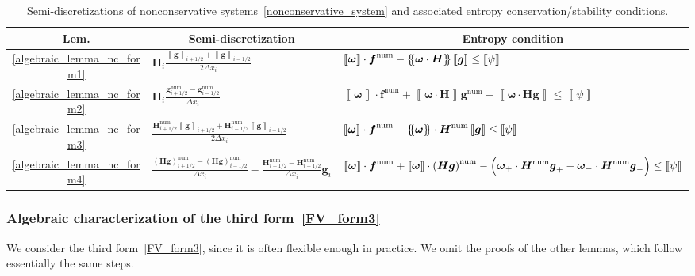\documentclass[]{scrartcl}
\newcommand*{\ldblbrace}{\{\mskip-5mu \left \{}
\newcommand*{\rdblbrace}{ \}\mskip-5mu \right \}}
\newcommand{\mean}[1]{\left\ldblbrace #1 \right\rdblbrace}
\renewcommand{\vec}[1]{\boldsymbol{#1}}
\newcommand{\jump}[1]{\left\llbracket #1  \right\rrbracket}
\theoremstyle{definition}
\begin{document}
\begin{table}[htbp]
\centering
  \caption{Semi-discretizations of nonconservative systems~\eqref{nonconservative_system} and associated entropy conservation/stability conditions.}
  \label{table_formulation}
  \centering
  \footnotesize
    \begin{tabular}{c ll}
      \toprule
      \multicolumn{1}{c}{Lem.}
      & \multicolumn{1}{c}{Semi-discretization}
      & \multicolumn{1}{c}{Entropy condition}\\
      \midrule
\ref{algebraic_lemma_nc_form1}
& $\vec{H}_i\frac{\jump{\vec{g}}_{i+1/2} + \jump{\vec{g}}_{i-1/2}}{2 \Delta x_i}$
& $\jump{\vec{\omega}} \cdot \vec{f}^\mathrm{num} - \mean{\vec{\omega} \cdot \vec{H}} \jump{\vec{g}} \leq \jump{\psi}$
\\
\ref{algebraic_lemma_nc_form2}
& $\vec{H}_i \frac{\vec{g}_{i+1/2}^{\mathrm{num}} - \vec{g}^{\mathrm{num}}_{i-1/2}}{\Delta x_i}$
& $\jump{\vec{\omega}} \cdot \vec{f}^\mathrm{num} +\jump{\vec{\omega} \cdot \vec{H}}\vec{g}^{\mathrm{num}} - \jump{\vec{\omega} \cdot \vec{H} \vec{g}} \leq \jump{\psi}$
\\
\ref{algebraic_lemma_nc_form3}
& $\frac{\vec{H}^{\mathrm{num}}_{i+1/2} \jump{\vec{g}}_{i+1/2} + \vec{H}^{\mathrm{num}}_{i-1/2} \jump{\vec{g}}_{i-1/2}}{2 \Delta x_i}$
& $\jump{\vec{\omega}} \cdot \vec{f}^\mathrm{num} - \mean{\vec{\omega}} \cdot \vec{H}^\mathrm{num} \jump{\vec{g}} \leq \jump{\psi}$
\\
\ref{algebraic_lemma_nc_form4}
& $\frac{\left (\vec{H} \vec{g} \right ) ^{\mathrm{num}}_{i+1/2} - \left (\vec{H} \vec{g} \right ) ^{\mathrm{num}}_{i-1/2}}{\Delta x_i} - \frac{\vec{H}^{\mathrm{num}}_{i+1/2} - \vec{H}^{\mathrm{num}}_{i-1/2}}{\Delta x_i} \vec{g}_i$
& $\jump{\vec{\omega}} \cdot \vec{f}^\mathrm{num} + \jump{\vec{\omega}} \cdot \left (\vec{H} \vec{g} \right )^{\mathrm{num}} - \Bigl (\vec{\omega}_+ \cdot \vec{H}^{\mathrm{num}} \vec{g}_+ - \vec{\omega}_- \cdot \vec{H}^{\mathrm{num}} \vec{g}_-\Bigr ) \leq \jump{\psi}$      \\
      \bottomrule
    \end{tabular}
\end{table}

\subsubsection{Algebraic characterization of the third form\texorpdfstring{~\eqref{FV_form3}}{}}
We consider the third form~\eqref{FV_form3}, since it is often flexible enough in practice.
We omit the proofs of the other lemmas, which follow essentially the same steps.
\end{document}
